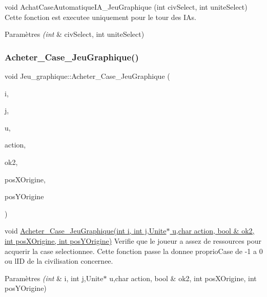 void Achat\+Case\+Automatique\+I\+A\+\_\+\+Jeu\+Graphique (int civ\+Select, int unite\+Select) Cette fonction est executee uniquement pour le tour des I\+As. 


\begin{DoxyParams}{Paramètres}
{\em (int} & civ\+Select, int unite\+Select) \\
\hline
\end{DoxyParams}
\mbox{\label{classJeu__graphique_a6686db5a36c47122f36d3fab0255e1b4}} 
\subsubsection{\texorpdfstring{Acheter\+\_\+\+Case\+\_\+\+Jeu\+Graphique()}{Acheter\_Case\_JeuGraphique()}}
{\footnotesize\ttfamily void Jeu\+\_\+graphique\+::\+Acheter\+\_\+\+Case\+\_\+\+Jeu\+Graphique (\begin{DoxyParamCaption}\item[{int}]{i,  }\item[{int}]{j,  }\item[{\hyperlink{classUnite}{Unite} $\ast$}]{u,  }\item[{char}]{action,  }\item[{bool \&}]{ok2,  }\item[{int}]{pos\+X\+Origine,  }\item[{int}]{pos\+Y\+Origine }\end{DoxyParamCaption})}



void \hyperlink{classJeu__graphique_a6686db5a36c47122f36d3fab0255e1b4}{Acheter\+\_\+\+Case\+\_\+\+Jeu\+Graphique(int i, int j,\+Unite$\ast$ u,char action, bool \& ok2, int pos\+X\+Origine, int pos\+Y\+Origine)} Verifie que le joueur a assez de ressources pour acquerir la case selectionnee. Cette fonction passe la donnee proprio\+Case de -\/1 a 0 ou l\textquotesingle{}ID de la civilisation concernee. 


\begin{DoxyParams}{Paramètres}
{\em (int} & i, int j,Unite$\ast$ u,char action, bool \& ok2, int pos\+X\+Origine, int pos\+Y\+Origine) \\
\hline
\end{DoxyParams}
\mbox{\label{classJeu__graphique_a1e3d0828a10fafe5d1e667dba8f4ef38}} 
